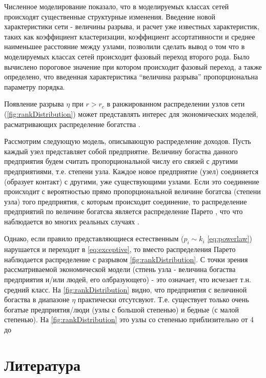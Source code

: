 \documentclass[10pt,aps,pra]{revtex4-1}
\begin{document}
    Численное моделирование показало, что в моделируемых классах сетей происходят существенные структурные изменения. Введение новой характеристики сети - величины разрыва, и расчет уже известных характеристик, таких как коэффициент кластеризации, коэффициент ассортативности и среднее наименьшее расстояние между узлами, позволили сделать вывод о том что в моделируемых классах сетей происходит фазовый переход второго рода. Было вычислено пороговое значение при котором происходит фазовый переход, а также определено, что введенная характеристика ``величина разрыва'' пропорциональна параметру порядка.

    Появление разрыва $\eta$ при $r>r_c$ в ранжированном распределении узлов сети (\ref{fig:rankDistribution}) может представлять интерес для экономических моделей, расматривающих распределение богатства \cite{Economics2}.

    Рассмотрим следующую модель, описывающую распределение доходов. Пусть каждый узел представляет собой предприятие. Величину богаства данного предприятия будем считать пропорциональной числу его связей с другими предприятиями, т.е. степени узла. Каждое новое предприятие (узел) соединяется (образует контакт) с другими, уже существующими узлами. Если это соединение происходит с вероятностью прямо пропорциональной величине богатсва (степени узла) того предприятия, с которым происходит соединение, то распределение предприятий по величине богатсва является распределение Парето \cite{Economics2, Economics1}, что что наблюдается во многих реальных случаях \cite{Economics1}.

    Однако, если правило представляющиеся естественным ($p_i \sim k_i$ \ref{eq:powerlaw}) нарушается и переходит в \ref{eq:exceptive}, то вместо распределения Парето наблюдается распределение с разрывом \ref{fig:rankDistribution}. С точки зрения рассматриваемой экономической модели (стпень узла - величина богаства предприятия и/или людей, его олбразующего) - это означает, что исчезает т.н. средний класс. На \ref{fig:rankDistribution} видно, что предприятия с величиной богаства в диапазоне $\eta$ практически отсутсвуют. Т.е. существует только очень богатые предприятия/люди (узлы  с большой степенью) и бедные (с малой степенью). На \ref{fig:rankDistribution} это узлы со степенью приблизительно от 4 до 

\section{Литература}

 

\end{document}
